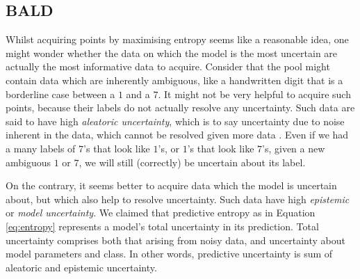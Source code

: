\documentclass[11pt, a4paper, bibliography=totoc]{report}
\begin{document}
\subsection{BALD}
Whilst acquiring points by maximising entropy seems like a reasonable idea, one might wonder whether the data on which the model is the most uncertain are actually the most informative data to acquire. Consider that the pool might contain data which are inherently ambiguous, like a handwritten digit that is a borderline case between a $ 1 $ and a $ 7 $. It might not be very helpful to acquire such points, because their labels do not actually resolve any uncertainty. Such data are said to have high \textit{aleatoric uncertainty}, which is to say uncertainty due to noise inherent in the data, which cannot be resolved given more data \cite[p.~7]{Gal2017a}. Even if we had a many labels of $ 7 $'s that look like $ 1 $'s, or $ 1 $'s that look like $ 7 $'s, given a new ambiguous $ 1 $ or $ 7 $, we will still (correctly) be uncertain about its label.

On the contrary, it seems better to acquire data which the model is uncertain about, but which also help to resolve uncertainty. Such data have high \textit{epistemic} or \textit{model uncertainty}. We claimed that predictive entropy as in Equation \ref{eq:entropy} represents a model's total uncertainty in its prediction. Total uncertainty comprises both that arising from noisy data, and uncertainty about model parameters and class. In other words, predictive uncertainty is sum of aleatoric and epistemic uncertainty.
\end{document}
